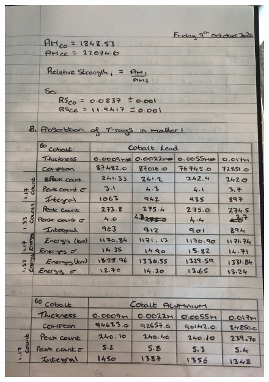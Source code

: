 \documentclass[12pt]{article}
\begin{document}
\begin{figure}[H]
\centering
\includegraphics[scale=0.17]{Images/IMG_0334.JPG}
\end{figure}
\newpage
\end{document}
